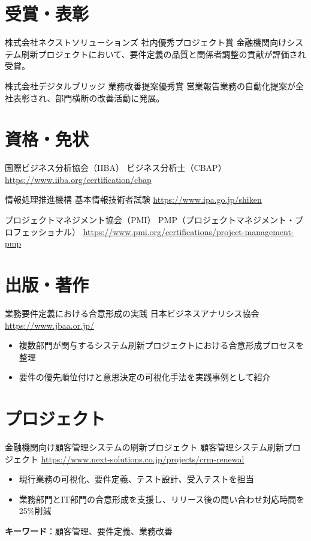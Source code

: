 \documentclass[a4paper, serif, 10pt]{moderncv}
\begin{document}
\section{受賞・表彰}

        {株式会社ネクストソリューションズ}
        {社内優秀プロジェクト賞}
        {}
        {}
        {金融機関向けシステム刷新プロジェクトにおいて、要件定義の品質と関係者調整の貢献が評価され受賞。}

        {株式会社デジタルブリッジ}
        {業務改善提案優秀賞}
        {}
        {}
        {営業報告業務の自動化提案が全社表彰され、部門横断の改善活動に発展。}
\section{資格・免状}

        {国際ビジネス分析協会（IIBA）}
        {ビジネス分析士（CBAP）}
        {\url{https://www.iiba.org/certification/cbap}}
        {}
        {}

        {情報処理推進機構}
        {基本情報技術者試験}
        {\url{https://www.ipa.go.jp/shiken}}
        {}
        {}

        {プロジェクトマネジメント協会（PMI）}
        {PMP（プロジェクトマネジメント・プロフェッショナル）}
        {\url{https://www.pmi.org/certifications/project-management-pmp}}
        {}
        {}
\section{出版・著作}

        {業務要件定義における合意形成の実践}
        {日本ビジネスアナリシス協会}
        {\url{https://www.jbaa.or.jp/}}
        {}
        {\begin{itemize}
\item 複数部門が関与するシステム刷新プロジェクトにおける合意形成プロセスを整理
\item 要件の優先順位付けと意思決定の可視化手法を実践事例として紹介
\end{itemize}}
\section{プロジェクト}

        {金融機関向け顧客管理システムの刷新プロジェクト}
        {顧客管理システム刷新プロジェクト}
        {\url{https://www.next-solutions.co.jp/projects/crm-renewal}}
        {}
        {\begin{itemize}
\item 現行業務の可視化、要件定義、テスト設計、受入テストを担当
\item 業務部門とIT部門の合意形成を支援し、リリース後の問い合わせ対応時間を25\%削減
\end{itemize}
\textbf{キーワード}：顧客管理、要件定義、業務改善}
\end{document}
